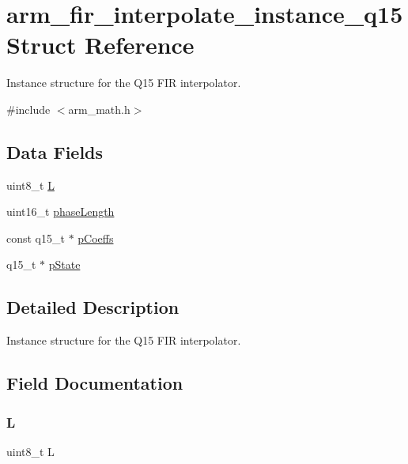 \hypertarget{structarm__fir__interpolate__instance__q15}{}\section{arm\+\_\+fir\+\_\+interpolate\+\_\+instance\+\_\+q15 Struct Reference}
\label{structarm__fir__interpolate__instance__q15}


Instance structure for the Q15 F\+IR interpolator.  




{\ttfamily \#include $<$arm\+\_\+math.\+h$>$}

\subsection*{Data Fields}
\begin{DoxyCompactItemize}
\item 
uint8\+\_\+t \mbox{\hyperlink{structarm__fir__interpolate__instance__q15_aee73cc056696e504430c53eaa9c58cf0}{L}}
\item 
uint16\+\_\+t \mbox{\hyperlink{structarm__fir__interpolate__instance__q15_a8f92bb07e0812f94679438cdf412b26a}{phase\+Length}}
\item 
const q15\+\_\+t $\ast$ \mbox{\hyperlink{structarm__fir__interpolate__instance__q15_ae85d417edcdce57e9a54f8c841580578}{p\+Coeffs}}
\item 
q15\+\_\+t $\ast$ \mbox{\hyperlink{structarm__fir__interpolate__instance__q15_ae29dfdb736374fcddaeaec4b7770170c}{p\+State}}
\end{DoxyCompactItemize}


\subsection{Detailed Description}
Instance structure for the Q15 F\+IR interpolator. 

\subsection{Field Documentation}
\mbox{\label{structarm__fir__interpolate__instance__q15_aee73cc056696e504430c53eaa9c58cf0}} 
\subsubsection{\texorpdfstring{L}{L}}
{\footnotesize\ttfamily uint8\+\_\+t L}

